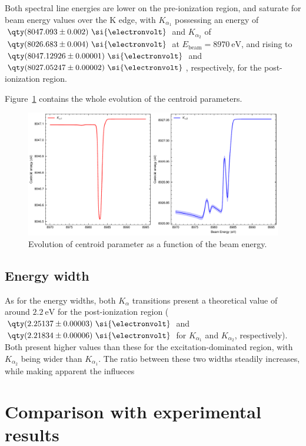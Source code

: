 Both spectral line energies are lower on the pre-ionization region, and saturate for beam energy values over the K edge, with $K_{\alpha_1}$ possessing an energy of $\qty(8047.093\pm0.002)\ \si{\electronvolt}$ and $K_{\alpha_2}$ of $\qty(8026.683\pm0.004)\ \si{\electronvolt}$   at $E_{\text{beam}}=8970\ \si{\electronvolt}$, and rising to $\qty(8047.12926 \pm 0.00001)\ \si{\electronvolt}$ and $\qty(8027.05247 \pm 0.00002)\ \si{\electronvolt}$, respectively, for the post-ionization region.

Figure~\ref{fig:centroid} contains the whole evolution of the centroid parameters.

\begin{figure}[h!]
    \centering
    \includegraphics[width=\linewidth]{Chapters/Figures/Chapter5/assym_centroids.pdf}
    \caption{Evolution of centroid parameter as a function of the beam energy.}\label{fig:centroid}
\end{figure}

\subsection{Energy width}

As for the energy widths, both $K_{\alpha}$ transitions present a theoretical value of around $2.2\ \si{\electronvolt}$ for the post-ionization region ($\qty(2.25137\pm 0.00003)\ \si{\electronvolt}$ and $\qty(2.21834\pm 0.00006)\ \si{\electronvolt}$ for $K_{\alpha_1}$ and $K_{\alpha_2}$, respectively). Both present higher values than these for the excitation-dominated region, with $K_{\alpha_2}$ being wider than $K_{\alpha_1}$. The ratio between these two widths steadily increases, while making apparent the influeces


 



\section{Comparison with experimental results}